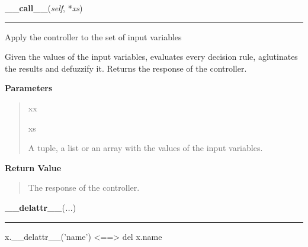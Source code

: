    \begin{boxedminipage}{\textwidth}

    \raggedright \textbf{\_\_call\_\_}(\textit{self}, *\textit{xs})

    \vspace{-1.5ex}

    \rule{\textwidth}{0.5\fboxrule}

Apply the controller to the set of input variables

Given the values of the input variables, evaluates every decision rule,
aglutinates the results and defuzzify it. Returns the response of the
controller.
    \vspace{1ex}

      \textbf{Parameters}
      \begin{quote}
        \begin{Ventry}{xx}

          \item[xs]


A tuple, a list or an array with the values of the input variables.
        \end{Ventry}

      \end{quote}

    \vspace{1ex}

      \textbf{Return Value}
      \begin{quote}

The response of the controller.
      \end{quote}

    \vspace{1ex}

    \end{boxedminipage}

    \label{object:__delattr__}

    \vspace{0.5ex}

    \begin{boxedminipage}{\textwidth}

    \raggedright \textbf{\_\_delattr\_\_}(\textit{...})

    \vspace{-1.5ex}

    \rule{\textwidth}{0.5\fboxrule}

x.{\_}{\_}delattr{\_}{\_}('name') {\textless}=={\textgreater} del x.name
    \vspace{1ex}

    \end{boxedminipage}


